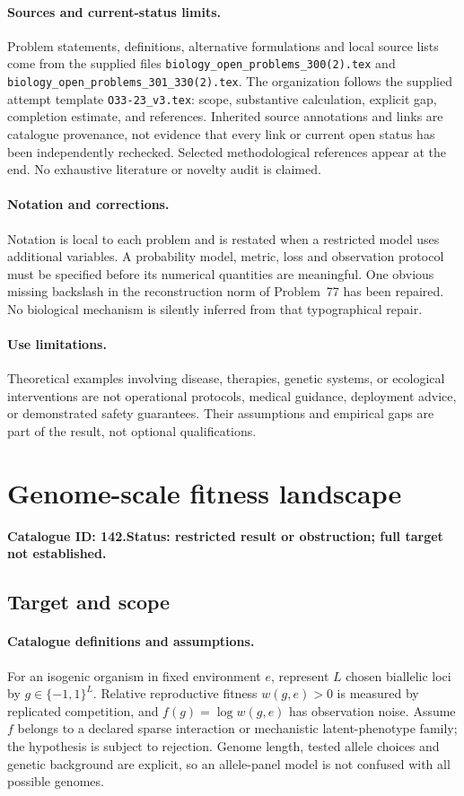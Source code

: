 \documentclass[11pt]{article}
\begin{document}
\paragraph{Sources and current-status limits.}
Problem statements, definitions, alternative formulations and local source lists
come from the supplied files
\texttt{biology\_open\_problems\_300(2).tex} and
\texttt{biology\_open\_problems\_301\_330(2).tex}.
The organization follows the supplied attempt template
\texttt{O33-23\_v3.tex}: scope, substantive calculation, explicit gap,
completion estimate, and references. Inherited source annotations and links are
catalogue provenance, not evidence that every link or current open status has
been independently rechecked. Selected methodological references appear at the
end. No exhaustive literature or novelty audit is claimed.

\paragraph{Notation and corrections.}
Notation is local to each problem and is restated when a restricted model uses
additional variables. A probability model, metric, loss and observation protocol
must be specified before its numerical quantities are meaningful. One obvious
missing backslash in the reconstruction norm of Problem~77 has been repaired.
No biological mechanism is silently inferred from that typographical repair.

\paragraph{Use limitations.}
Theoretical examples involving disease, therapies, genetic systems, or ecological
interventions are not operational protocols, medical guidance, deployment advice,
or demonstrated safety guarantees. Their assumptions and empirical gaps are part
of the result, not optional qualifications.

\setcounter{section}{141}
\section{Genome-scale fitness landscape}
\label{prob:142}
\noindent\textbf{Catalogue ID: 142.}\quad \textbf{Status: restricted result or obstruction; full target not established.}
\subsection{Target and scope}
\paragraph{Catalogue definitions and assumptions.}
For an isogenic organism in fixed environment $e$, represent $L$ chosen biallelic loci by $g\in\{-1,1\}^L$. Relative reproductive fitness $w(g,e)>0$ is measured by replicated competition, and $f(g)=\log w(g,e)$ has observation noise. Assume $f$ belongs to a declared sparse interaction or mechanistic latent-phenotype family; the hypothesis is subject to rejection. Genome length, tested allele choices and genetic background are explicit, so an allele-panel model is not confused with all possible genomes.
\end{document}
